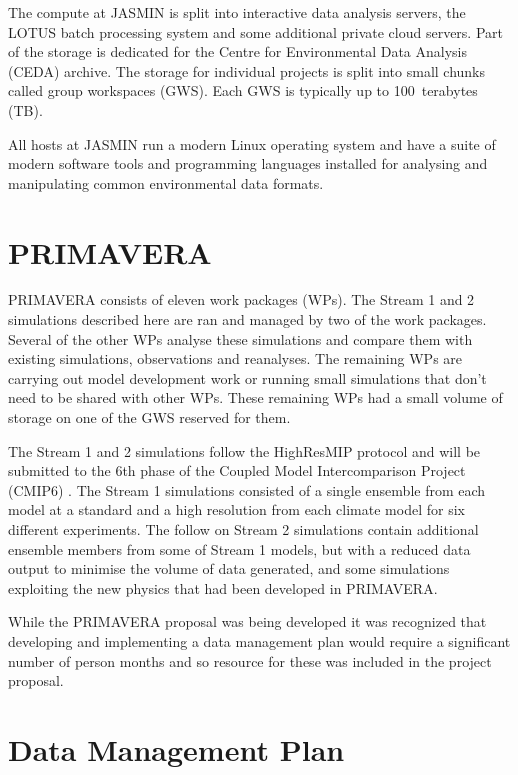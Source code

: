 \documentclass[gmd, manuscript]{copernicus}
\begin{document}
The compute at JASMIN is split into interactive data analysis servers, the LOTUS batch processing system and some additional private cloud servers. Part of the storage is dedicated for the Centre for Environmental Data Analysis (CEDA) archive. The storage for individual projects is split into small chunks called group workspaces (GWS). Each GWS is typically up to 100~terabytes (TB).

All hosts at JASMIN run a modern Linux operating system and have a suite of modern software tools and programming languages installed for analysing and manipulating common environmental data formats.

\section{PRIMAVERA}

PRIMAVERA consists of eleven work packages (WPs). The Stream 1 and 2 simulations described here are ran and managed by two of the work packages. Several of the other WPs analyse these simulations and compare them with existing simulations, observations and reanalyses. The remaining WPs are carrying out model development work or running small simulations that don't need to be shared with other WPs. These remaining WPs had a small volume of storage on one of the GWS reserved for them.

The Stream 1 and 2 simulations follow the HighResMIP protocol and will be submitted to the 6th phase of the Coupled Model Intercomparison Project (CMIP6) \citep{Eyring2016}. The Stream 1 simulations consisted of a single ensemble from each model at a standard and a high resolution from each climate model for six different experiments. The follow on Stream 2 simulations contain additional ensemble members from some of Stream 1 models, but with a reduced data output to minimise the volume of data generated, and some simulations exploiting the new physics that had been developed in PRIMAVERA.

While the PRIMAVERA proposal was being developed it was recognized that developing and implementing a data management plan would require a significant number of person months and so resource for these was included in the project proposal.


\section{Data Management Plan}

\end{document}
